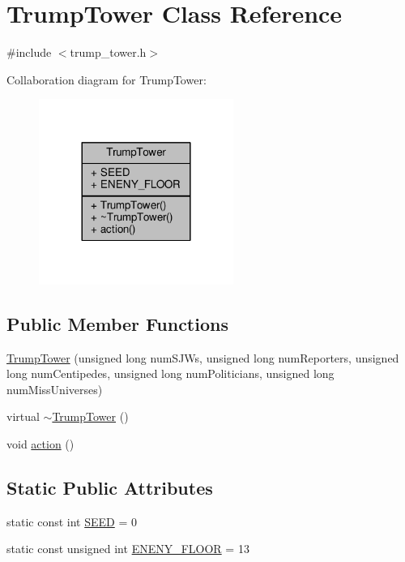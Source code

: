 \hypertarget{classTrumpTower}{}\section{Trump\+Tower Class Reference}
\label{classTrumpTower}


{\ttfamily \#include $<$trump\+\_\+tower.\+h$>$}



Collaboration diagram for Trump\+Tower\+:
\nopagebreak
\begin{figure}[H]
\begin{center}
\leavevmode
\includegraphics[width=180pt]{classTrumpTower__coll__graph}
\end{center}
\end{figure}
\subsection*{Public Member Functions}
\begin{DoxyCompactItemize}
\item 
\hyperlink{classTrumpTower_a289ef64fd3602f7df558eeeda36ab237}{Trump\+Tower} (unsigned long num\+S\+J\+Ws, unsigned long num\+Reporters, unsigned long num\+Centipedes, unsigned long num\+Politicians, unsigned long num\+Miss\+Universes)
\item 
virtual \hyperlink{classTrumpTower_aa9ac742a7e39584d63207cbff1712c21}{$\sim$\+Trump\+Tower} ()
\item 
void \hyperlink{classTrumpTower_a2eb063d540d428f2f41bf5264e67c283}{action} ()
\end{DoxyCompactItemize}
\subsection*{Static Public Attributes}
\begin{DoxyCompactItemize}
\item 
static const int \hyperlink{classTrumpTower_a7207ac5ab137b0fc2ff175eec3592fec}{S\+E\+ED} = 0
\item 
static const unsigned int \hyperlink{classTrumpTower_aae8db3b60d8960faf570d0e35ba195d6}{E\+N\+E\+N\+Y\+\_\+\+F\+L\+O\+OR} = 13
\end{DoxyCompactItemize}


